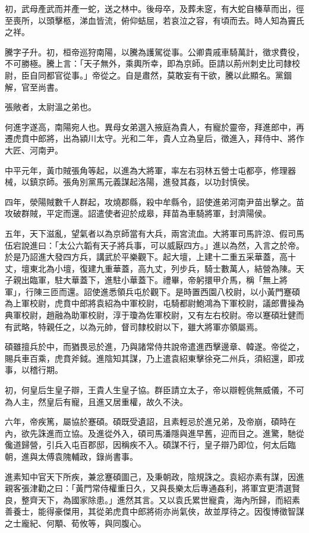 \begin{pinyinscope}
初，武母產武而并產一蛇，送之林中。後母卒，及葬未窆，有大蛇自榛草而出，徑至喪所，以頭擊柩，涕血皆流，俯仰蛣屈，若哀泣之容，有頃而去。時人知為竇氏之祥。

騰字子升。初，桓帝巡狩南陽，以騰為護駕從事。公卿貴戚車騎萬計，徵求費役，不可勝極。騰上言：「天子無外，乘輿所幸，即為京師。臣請以荊州刺史比司隸校尉，臣自同都官從事。」帝從之。自是肅然，莫敢妄有干欲，騰以此顯名。黨錮解，官至尚書。

張敞者，太尉溫之弟也。

何進字遂高，南陽宛人也。異母女弟選入掖庭為貴人，有寵於靈帝，拜進郎中，再遷虎賁中郎將，出為潁川太守。光和二年，貴人立為皇后，徵進入，拜侍中、將作大匠、河南尹。

中平元年，黃巾賊張角等起，以進為大將軍，率左右羽林五營士屯都亭，修理器械，以鎮京師。張角別黨馬元義謀起洛陽，進發其姦，以功封慎侯。

四年，滎陽賊數千人群起，攻燒郡縣，殺中牟縣令，詔使進弟河南尹苗出擊之。苗攻破群賊，平定而還。詔遣使者迎於成皋，拜苗為車騎將軍，封濟陽侯。

五年，天下滋亂，望氣者以為京師當有大兵，兩宮流血。大將軍司馬許涼、假司馬伍宕說進曰：「太公六韜有天子將兵事，可以威厭四方。」進以為然，入言之於帝。於是乃詔進大發四方兵，講武於平樂觀下。起大壇，上建十二重五采華蓋，高十丈，壇東北為小壇，復建九重華蓋，高九丈，列步兵，騎士數萬人，結營為陳。天子親出臨軍，駐大華蓋下，進駐小華蓋下。禮畢，帝躬擐甲介馬，稱「無上將軍」，行陳三匝而還。詔使進悉領兵屯於觀下。是時置西園八校尉，以小黃門蹇碩為上軍校尉，虎賁中郎將袁紹為中軍校尉，屯騎都尉鮑鴻為下軍校尉，議郎曹操為典軍校尉，趙融為助軍校尉，淳于瓊為佐軍校尉，又有左右校尉。帝以蹇碩壯健而有武略，特親任之，以為元帥，督司隸校尉以下，雖大將軍亦領屬焉。

碩雖擅兵於中，而猶畏忌於進，乃與諸常侍共說帝遣進西擊邊章、韓遂。帝從之，賜兵車百乘，虎賁斧鉞。進陰知其謀，乃上遣袁紹東擊徐兗二州兵，須紹還，即戎事，以稽行期。

初，何皇后生皇子辯，王貴人生皇子協。群臣請立太子，帝以辯輕佻無威儀，不可為人主，然皇后有寵，且進又居重權，故久不決。

六年，帝疾篤，屬協於蹇碩。碩既受遺詔，且素輕忌於進兄弟，及帝崩，碩時在內，欲先誅進而立協。及進從外入，碩司馬潘隱與進早舊，迎而目之。進驚，馳從儳道歸營，引兵入屯百郡邸，因稱疾不入。碩謀不行，皇子辯乃即位，何太后臨朝，進與太傅袁隗輔政，錄尚書事。

進素知中官天下所疾，兼忿蹇碩圖己，及秉朝政，陰規誅之。袁紹亦素有謀，因進親客張津勸之曰：「黃門常侍權重日久，又與長樂太后專通姦利，將軍宜更清選賢良，整齊天下，為國家除患。」進然其言。又以袁氏累世寵貴，海內所歸，而紹素善養士，能得豪傑用，其從弟虎賁中郎將術亦尚氣俠，故並厚待之。因復博徵智謀之士龐紀、何顒、荀攸等，與同腹心。


\end{pinyinscope}
